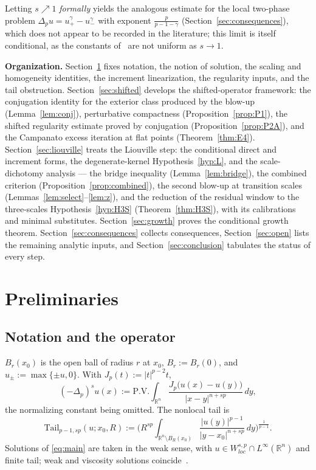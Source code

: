 \documentclass[11pt]{amsart}
\theoremstyle{plain}
\theoremstyle{definition}
\theoremstyle{remark}
\newcommand{\R}{\mathbb{R}}
\newcommand{\fpl}[1]{(-\Delta_p)^{s}#1}
\newcommand{\Jp}[1]{|#1|^{p-2}#1}
\newcommand{\Tail}{\mathrm{Tail}_{p-1,sp}}
\begin{document}
Letting $s\nearrow1$ \emph{formally} yields the analogous estimate for the
local two-phase problem $\Delta_p u=u_+^\gamma-u_-^\gamma$ with exponent
$\frac{p}{p-1-\gamma}$ (Section~\ref{sec:consequences}), which does not appear
to be recorded in the literature; this limit is itself conditional, as the
constants of~\cite{GJS} are not uniform as $s\to1$.

\medskip
\noindent\textbf{Organization.} Section~\ref{sec:prelim} fixes notation, the
notion of solution, the scaling and homogeneity identities, the increment
linearization, the regularity inputs, and the tail obstruction.
Section~\ref{sec:shifted} develops the shifted-operator framework: the
conjugation identity for the exterior class produced by the blow-up
(Lemma~\ref{lem:conj}), perturbative compactness
(Proposition~\ref{prop:P1}), the shifted regularity estimate proved by
conjugation (Proposition~\ref{prop:P2A}), and the Campanato excess iteration
at flat points (Theorem~\ref{thm:E4}).
Section~\ref{sec:liouville} treats the Liouville step: the conditional direct
and increment forms, the degenerate-kernel Hypothesis~\ref{hyp:L}, and the
scale-dichotomy analysis --- the bridge inequality
(Lemma~\ref{lem:bridge}), the combined criterion
(Proposition~\ref{prop:combined}), the second blow-up at transition scales
(Lemmas~\ref{lem:select}--\ref{lem:z}), and the reduction of the residual
window to the three-scales Hypothesis~\ref{hyp:H3S}
(Theorem~\ref{thm:H3S}), with its calibrations and minimal substitutes.
Section~\ref{sec:growth} proves the conditional growth theorem.
Section~\ref{sec:consequences} collects consequences,
Section~\ref{sec:open} lists the remaining analytic inputs, and
Section~\ref{sec:conclusion} tabulates the status of every step.

\section{Preliminaries}\label{sec:prelim}

\subsection{Notation and the operator}
$B_r(x_0)$ is the open ball of radius $r$ at $x_0$, $B_r:=B_r(0)$, and
$u_\pm:=\max\{\pm u,0\}$. With $J_p(t):=\Jp{t}$,
\[
  \fpl{u}(x):=\mathrm{P.V.}\!\int_{\R^n}
    \frac{J_p\big(u(x)-u(y)\big)}{|x-y|^{n+sp}}\,dy,
\]
the normalizing constant being omitted. The nonlocal tail is
\[
  \Tail(u;x_0,R):=\Big(R^{sp}\!\int_{\R^n\setminus B_R(x_0)}
    \frac{|u(y)|^{p-1}}{|y-x_0|^{n+sp}}\,dy\Big)^{\!\frac{1}{p-1}}.
\]
Solutions of \eqref{eq:main} are taken in the weak sense, with
$u\in W^{s,p}_{loc}\cap L^\infty(\R^n)$ and finite tail; weak and viscosity
solutions coincide~\cite{KKL}.
\end{document}
